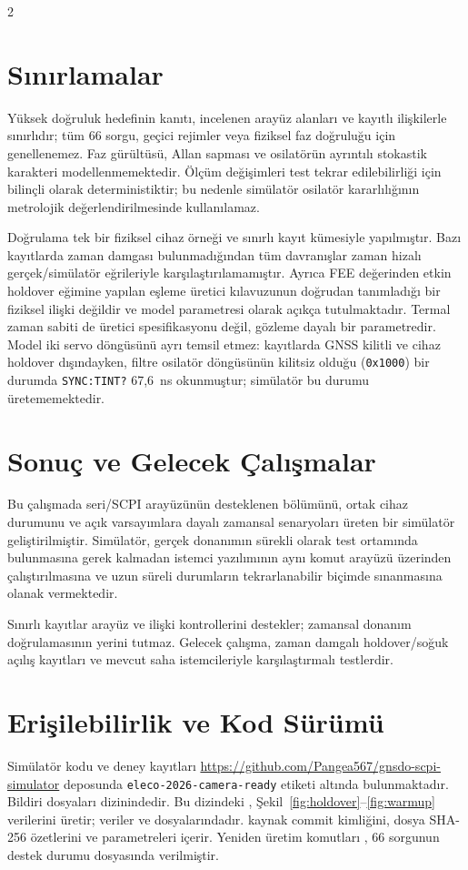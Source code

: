 \documentclass[9pt,twocolumn,a4paper]{extarticle}
\begin{document}
\begin{multicols}{2}
\section{Sınırlamalar}
Yüksek doğruluk hedefinin kanıtı, incelenen arayüz alanları ve kayıtlı ilişkilerle sınırlıdır; tüm 66 sorgu, geçici rejimler veya fiziksel faz doğruluğu için genellenemez. Faz gürültüsü, Allan sapması ve osilatörün ayrıntılı stokastik karakteri modellenmemektedir. Ölçüm değişimleri test tekrar edilebilirliği için bilinçli olarak deterministiktir; bu nedenle simülatör osilatör kararlılığının metrolojik değerlendirilmesinde kullanılamaz.

Doğrulama tek bir fiziksel cihaz örneği ve sınırlı kayıt kümesiyle yapılmıştır. Bazı kayıtlarda zaman damgası bulunmadığından tüm davranışlar zaman hizalı gerçek/simülatör eğrileriyle karşılaştırılamamıştır. Ayrıca FEE değerinden etkin holdover eğimine yapılan eşleme üretici kılavuzunun doğrudan tanımladığı bir fiziksel ilişki değildir ve model parametresi olarak açıkça tutulmaktadır. Termal zaman sabiti de üretici spesifikasyonu değil, gözleme dayalı bir parametredir. Model iki servo döngüsünü ayrı temsil etmez: kayıtlarda GNSS kilitli ve cihaz holdover dışındayken, filtre osilatör döngüsünün kilitsiz olduğu (\texttt{0x1000}) bir durumda \texttt{SYNC:TINT?} 67,6~ns okunmuştur; simülatör bu durumu üretememektedir.

\section{Sonuç ve Gelecek Çalışmalar}
Bu çalışmada seri/SCPI arayüzünün desteklenen bölümünü, ortak cihaz durumunu ve açık varsayımlara dayalı zamansal senaryoları üreten bir simülatör geliştirilmiştir. Simülatör, gerçek donanımın sürekli olarak test ortamında bulunmasına gerek kalmadan istemci yazılımının aynı komut arayüzü üzerinden çalıştırılmasına ve uzun süreli durumların tekrarlanabilir biçimde sınanmasına olanak vermektedir.

Sınırlı kayıtlar arayüz ve ilişki kontrollerini destekler; zamansal donanım doğrulamasının yerini tutmaz. Gelecek çalışma, zaman damgalı holdover/soğuk açılış kayıtları ve mevcut saha istemcileriyle karşılaştırmalı testlerdir.

\section{Erişilebilirlik ve Kod Sürümü}
\label{sec:availability}
Simülatör kodu ve deney kayıtları \url{https://github.com/Pangea567/gnsdo-scpi-simulator} deposunda \nolinkurl{eleco-2026-camera-ready} etiketi altında bulunmaktadır. Bildiri dosyaları  dizinindedir. Bu dizindeki , Şekil~\ref{fig:holdover}--\ref{fig:warmup} verilerini üretir; veriler  ve  dosyalarındadır.  kaynak commit kimliğini, dosya SHA-256 özetlerini ve parametreleri içerir. Yeniden üretim komutları , 66 sorgunun destek durumu  dosyasında verilmiştir.


\end{multicols}
\end{document}
